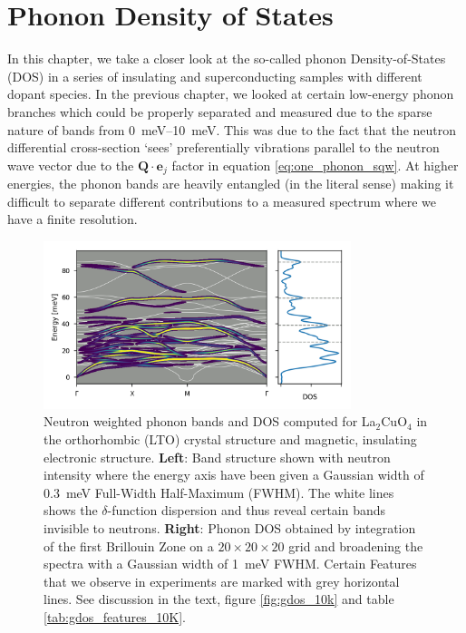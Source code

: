 \chapter{Phonon Density of States}\label{ch:in4}

In this chapter, we take a closer look at the so-called phonon Density-of-States (DOS) in a series of insulating and superconducting samples with different dopant species. In the previous chapter, we looked at certain low-energy phonon branches which could be properly separated and measured due to the sparse nature of bands from \SIrange{0}{10}{\milli\eV}. This was due to the fact that the neutron differential cross-section `sees' preferentially vibrations parallel to the neutron wave vector due to the $\bm{Q} \cdot \bm{e}_j$ factor in equation \eqref{eq:one_phonon_sqw}. At higher energies, the phonon bands are heavily entangled (in the literal sense) making it difficult to separate different contributions to a measured spectrum where we have a finite resolution.

\begin{figure}
    \centering
    \includegraphics[width=0.8\textwidth]{fig/gdos/neutron_bands_dos_lto_afm.png}
    \caption{Neutron weighted phonon bands and DOS computed for La$_2$CuO$_4$ in the orthorhombic (LTO) crystal structure and magnetic, insulating electronic structure. \textbf{Left}: Band structure shown with neutron intensity where the energy axis have been given a Gaussian width of \SI{0.3}{\milli\eV} Full-Width Half-Maximum (FWHM). The white lines shows the $\delta$-function dispersion and thus reveal certain bands invisible to neutrons. \textbf{Right}: Phonon DOS obtained by integration of the first Brillouin Zone on a $20 \times 20 \times 20$ grid and broadening the spectra with a Gaussian width of \SI{1}{\milli\eV} FWHM. Certain Features that we observe in experiments are marked with grey horizontal lines. See discussion in the text, figure \ref{fig:gdos_10k} and table \ref{tab:gdos_features_10K}.}
    \label{fig:neutron_bands_dos_lto_afm}
\end{figure}

